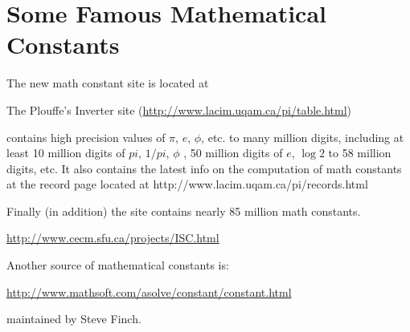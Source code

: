 \section{Some Famous Mathematical Constants}
The new math constant site is located at

The Plouffe's Inverter site 
(\url{http://www.lacim.uqam.ca/pi/table.html})

contains high precision values of
$\pi$, $e$, $\phi$, etc.  to many million digits,
including at least 10 million digits of $pi$,
$1/pi$, $\phi$ , 50 million digits of $e$, $\log 2$ to 58 million
digits, etc. It also contains the latest info on the computation
of math constants at the record page located at
http://www.lacim.uqam.ca/pi/records.html

Finally (in addition) the site contains nearly 85 million math
constants.



\url{http://www.cecm.sfu.ca/projects/ISC.html}


Another source of mathematical constants is:

\url{http://www.mathsoft.com/asolve/constant/constant.html}

maintained by Steve Finch.
